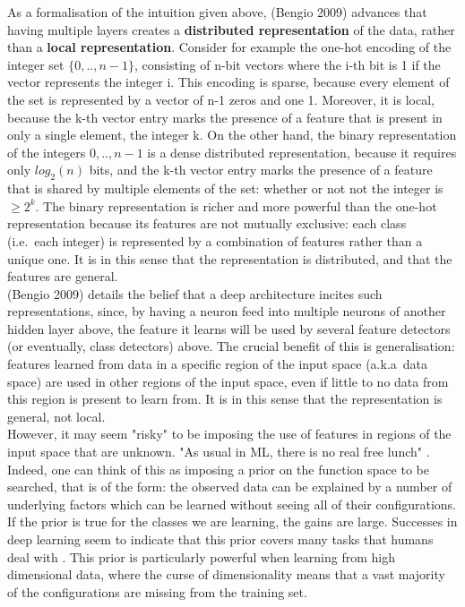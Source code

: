 \documentclass[a4paper,11pt]{article}
\begin{document}
As a formalisation of the intuition given above, (Bengio 2009) \cite{DL-book} advances that having multiple layers creates a \textbf{distributed representation} of the data, rather than a \textbf{local representation}. Consider for example the one-hot encoding of the integer set $\{0, .., n-1\}$, consisting of n-bit vectors where the i-th bit is 1 if the vector represents the integer i. This encoding is sparse, because every element of the set is represented by a vector of n-1 zeros and one 1. Moreover, it is local, because the k-th vector entry marks the presence of a feature that is present in only a single element, the integer k. On the other hand, the binary representation of the integers ${0, .., n-1}$ is a dense distributed representation, because it requires only $log_2(n)$ bits, and the k-th vector entry marks the presence of a feature that is shared by multiple elements of the set: whether or not not the integer is $\geq 2^k$. The binary representation is richer and more powerful than the one-hot representation because its features are not mutually exclusive: each class (i.e.\ each integer) is represented by a combination of features rather than a unique one. It is in this sense that the representation is distributed, and that the features are general. \\

(Bengio 2009) \cite{DL-book} details the belief that a deep architecture incites such representations, since, by having a neuron feed into multiple neurons of another hidden layer above, the feature it learns will be used by several feature detectors (or eventually, class detectors) above. The crucial benefit of this is generalisation: features learned from data in a specific region of the input space (a.k.a\ data space) are used in other regions of the input space, even if little to no data from this region is present to learn from. It is in this sense that the representation is general, not local. \\

However, it may seem "risky" to be imposing the use of features in regions of the input space that are unknown. "As usual in ML, there is no real free lunch" \cite{Bengio_G+}. Indeed, one can think of this as imposing a prior on the function space to be searched, that is of the form: the observed data can be explained by a number of underlying factors which can be learned without seeing all of their configurations. If the prior is true for the classes we are learning, the gains are large. Successes in deep learning seem to indicate that this prior covers many tasks that humans deal with \cite{Bengio_G+}. This prior is particularly powerful when learning from high dimensional data, where the curse of dimensionality means that a vast majority of the configurations are missing from the training set. \\
\end{document}

